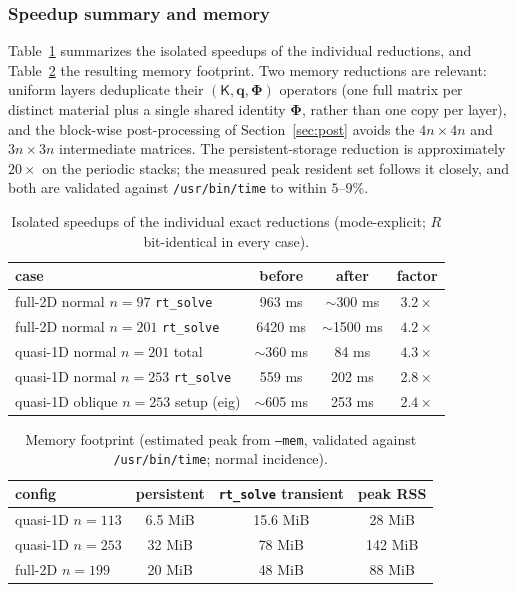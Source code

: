\documentclass[11pt]{article}
\theoremstyle{remark}
\newcommand{\kp}{\mathsf{K}}
\newcommand{\Ph}{\mathbf{\Phi}}
\newcommand{\fq}{\mathbf{q}}
\begin{document}
\subsubsection{Speedup summary and memory}

Table~\ref{tab:speedup} summarizes the isolated speedups of the individual
reductions, and Table~\ref{tab:mem} the resulting memory footprint.  Two
memory reductions are relevant: uniform layers deduplicate their
$(\kp,\fq,\Ph)$ operators (one full matrix per distinct material plus a single
shared identity $\Ph$, rather than one copy per layer), and the block-wise
post-processing of Section~\ref{sec:post} avoids the $4n\times4n$ and
$3n\times3n$ intermediate matrices.  The persistent-storage reduction is
approximately $20\times$ on the periodic stacks; the measured peak resident
set follows it closely, and both are validated against \texttt{/usr/bin/time}
to within $5$--$9\%$.

\begin{table}[t]
\centering
\caption{Isolated speedups of the individual exact reductions (mode-explicit;
$R$ bit-identical in every case).}
\label{tab:speedup}
\begin{tabular}{lccc}
\toprule
case & before & after & factor\\
\midrule
full-2D normal $n=97$ \texttt{rt\_solve} & 963 ms & $\sim$300 ms & $3.2\times$\\
full-2D normal $n=201$ \texttt{rt\_solve} & 6420 ms & $\sim$1500 ms & $4.2\times$\\
quasi-1D normal $n=201$ total & $\sim$360 ms & 84 ms & $4.3\times$\\
quasi-1D normal $n=253$ \texttt{rt\_solve} & 559 ms & 202 ms & $2.8\times$\\
quasi-1D oblique $n=253$ setup (eig) & $\sim$605 ms & 253 ms & $2.4\times$\\
\bottomrule
\end{tabular}
\end{table}

\begin{table}[t]
\centering
\caption{Memory footprint (estimated peak from \texttt{--mem}, validated
against \texttt{/usr/bin/time}; normal incidence).}
\label{tab:mem}
\begin{tabular}{lccc}
\toprule
config & persistent & \texttt{rt\_solve} transient & peak RSS\\
\midrule
quasi-1D $n=113$ & 6.5 MiB & 15.6 MiB & 28 MiB\\
quasi-1D $n=253$ & 32 MiB & 78 MiB & 142 MiB\\
full-2D $n=199$ & 20 MiB & 48 MiB & 88 MiB\\
\bottomrule
\end{tabular}
\end{table}
\end{document}

